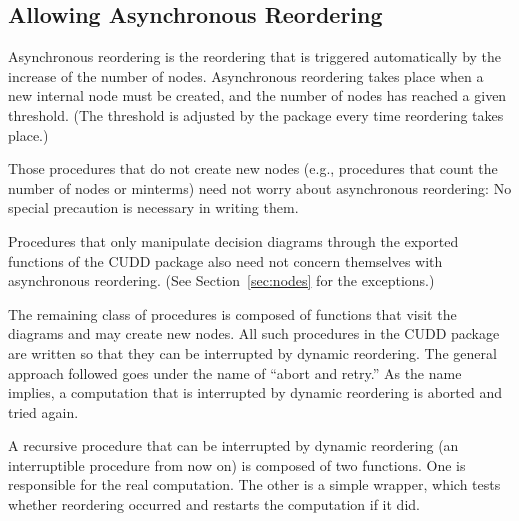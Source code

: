 \documentclass[11pt]{article}
\begin{document}
\subsection{Allowing Asynchronous Reordering}
\label{sec:async}

Asynchronous reordering is the reordering that is triggered
automatically by the increase of the number of nodes. Asynchronous
reordering takes place when a new internal node must be created, and
the number of nodes has reached a given
threshold. (The threshold is adjusted by
the package every time reordering takes place.)

Those procedures that do not create new nodes (e.g., procedures that
count the number of nodes or minterms) need
not worry about asynchronous reordering: No special precaution is
necessary in writing them.

Procedures that only manipulate decision diagrams through the exported
functions of the CUDD package also need not concern themselves with
asynchronous reordering. (See Section~\ref{sec:nodes} for the
exceptions.)

The remaining class of procedures is composed of functions that visit
the diagrams and may create new nodes. All such procedures in the CUDD
package are written so that they can be interrupted by dynamic
reordering. The general approach followed goes under the name of
``abort and retry.'' As the name
implies, a computation that is interrupted by dynamic reordering is
aborted and tried again.

A recursive procedure that can be interrupted by dynamic reordering
(an interruptible procedure
from now on) is composed of two functions.  One is responsible for the
real computation. The other is a simple
wrapper, which tests whether
reordering occurred and restarts the computation if it did.
\end{document}
